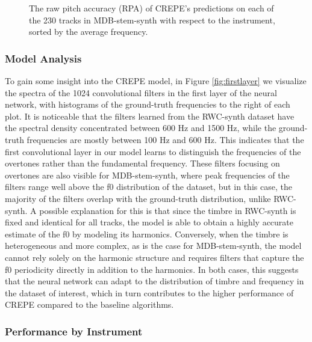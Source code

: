 \begin{figure}[t]
\begin{minipage}{0.48\textwidth}
\begin{center}
		\end{center}
		\vspace{-10pt}
		\caption{
			The raw pitch accuracy (RPA) of CREPE's predictions on each of the 230 tracks in MDB-stem-synth with respect to the instrument, sorted by the average frequency.
		}
		\label{fig:per-track}
	\end{minipage}
\end{figure}


\subsubsection{Model Analysis}

To gain some insight into the CREPE model, in Figure \ref{fig:firstlayer} we visualize the spectra of the 1024 convolutional filters in the first layer of the neural network, with histograms of the ground-truth frequencies to the right of each plot.
It is noticeable that the filters learned from the RWC-synth dataset have the spectral density concentrated between 600 Hz and 1500 Hz, while the ground-truth frequencies are mostly between 100 Hz and 600 Hz.
This indicates that the first convolutional layer in our model learns to distinguish the frequencies of the overtones rather than the fundamental frequency.
These filters focusing on overtones are also visible for MDB-stem-synth, where peak frequencies of the filters range well above the f0 distribution of the dataset, but in this case, the majority of the filters overlap with the ground-truth distribution, unlike RWC-synth.
A possible explanation for this is that since the timbre in RWC-synth is fixed and identical for all tracks, the model is able to obtain a highly accurate estimate of the f0 by modeling its harmonics.
Conversely, when the timbre is heterogeneous and more complex, as is the case for MDB-stem-synth, the model cannot rely solely on the harmonic structure and requires filters that capture the f0 periodicity directly in addition to the harmonics.
In both cases, this suggests that the neural network can adapt to the distribution of timbre and frequency in the dataset of interest, which in turn contributes to the higher performance of CREPE compared to the baseline algorithms.

\subsubsection{Performance by Instrument}

